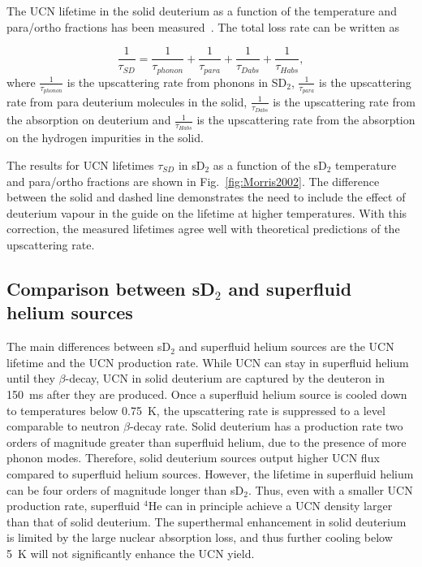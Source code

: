 The UCN lifetime in the solid deuterium as a function of the temperature
and para/ortho fractions has been measured~\cite{Morris2002}. The
total loss rate can be written as

\begin{equation}
\label{eqn:SD_lifetime}
\frac{1}{\tau_{SD}}=\frac{1}{\tau_{phonon}}+\frac{1}{\tau_{para}}+\frac{1}{\tau_{Dabs}}+ \frac{1}{\tau_{Habs}},
\end{equation}
where $\frac{1}{\tau_{phonon}}$ is the upscattering rate from phonons
in SD$_2$, $\frac{1}{\tau_{para}}$ is the upscattering rate from para
deuterium molecules in the solid, $\frac{1}{\tau_{Dabs}}$ is the
upscattering rate from the absorption on deuterium and
$\frac{1}{\tau_{Habs}}$ is the upscattering rate from the absorption
on the hydrogen impurities in the solid.



The results for UCN lifetimes
$\tau_{SD}$ in sD$_2$ as a function of the sD$_2$ temperature and
para/ortho fractions are shown in Fig.~\ref{fig:Morris2002}. The
difference between the solid and dashed line demonstrates the need to
include the effect of deuterium vapour in the guide on the lifetime at
higher temperatures. With this correction, the measured lifetimes
agree well with theoretical predictions of the upscattering rate.


\subsection{Comparison between sD$_2$ and superfluid helium sources}

The main differences between sD$_2$ and superfluid helium sources are
the UCN lifetime and the UCN production rate. While UCN can stay in
superfluid helium until they $\beta$-decay, UCN in solid deuterium are
captured by the deuteron in 150~ms after they are produced.  Once a
superfluid helium source is cooled down to temperatures below 0.75~K,
the upscattering rate is suppressed to a level comparable to neutron
$\beta$-decay rate. Solid deuterium has a production rate two orders
of magnitude greater than superfluid helium, due to the presence of
more phonon modes. Therefore, solid deuterium sources output higher
UCN flux compared to superfluid helium sources. However, the lifetime
in superfluid helium can be four orders of magnitude longer than
sD$_2$. Thus, even with a smaller UCN production rate, superfluid
$^4$He can in principle achieve a UCN density larger than that of
solid deuterium.  The superthermal enhancement in solid deuterium is
limited by the large nuclear absorption loss, and thus further cooling
below 5~K will not significantly enhance the UCN yield.

